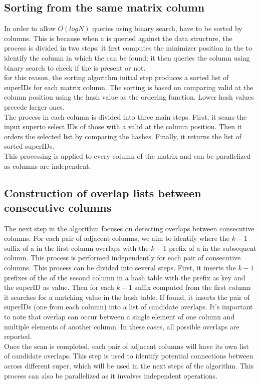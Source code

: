 \subsection{Sorting \kmers from the same matrix column}
\label{sec:skmersorting}
In order to allow $O(log{N})$ queries using binary search, \kmers have to be sorted by columns. This is because when a \kmer is queried against the data structure, the process is divided in two steps: it first computes the minimizer position in the \kmer to identify the column in which the \kmer can be found; it then queries the column using binary search to check if the \kmer is present or not.\\
for this reason, the sorting algorithm initial step produces a sorted list of super\kmer IDs for each matrix column. The sorting is based on comparing valid \kmers at the column position using the \kmer hash value as the ordering function. Lower hash values precede larger ones.\\
The process in each column is divided into three main steps. First, it scans the input super\kmers to select IDs of those with a valid \kmer at the column position. Then it orders the selected list by comparing the \kmer hashes. Finally, it returns the list of sorted super\kmer IDs.\\
This processing is applied to every column of the matrix and can be parallelized as columns are independent.

\subsection{Construction of overlap lists between consecutive columns}
\label{sec:skmeroverlap}
The next step in the algorithm focuses on detecting overlaps between consecutive columns. For each pair of adjacent columns, we aim to identify where the $k-1$ suffix of a \kmer in the first column overlaps with the $k-1$ prefix of a \kmer in the subsequent column. This process is performed independently for each pair of consecutive columns. This process can be divided into several steps. First, it inserts the $k-1$ prefixes of the \kmers of the second column in a hash table with the prefix as key and the super\kmer ID as value. Then for each $k-1$ suffix computed from the first column it searches for a matching value in the hash table. If found, it inserts the pair of super\kmer IDs (one from each column) into a list of candidate overlaps. It's important to note that overlap can occur between a single element of one column and multiple elements of another column. In these cases, all possible overlaps are reported. \\
Once the scan is completed, each pair of adjacent columns will have its own list of candidate overlaps. This step is used to identify potential connections between \kmers across different super\kmers, which will be used in the next steps of the algorithm. This process can also be parallelized as it involves independent operations.

